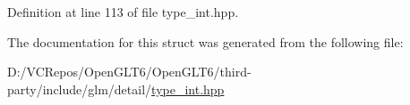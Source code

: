 Definition at line 113 of file type\+\_\+int.\+hpp.



The documentation for this struct was generated from the following file\+:\begin{DoxyCompactItemize}
\item 
D\+:/\+V\+C\+Repos/\+Open\+G\+L\+T6/\+Open\+G\+L\+T6/third-\/party/include/glm/detail/\mbox{\hyperlink{type__int_8hpp}{type\+\_\+int.\+hpp}}\end{DoxyCompactItemize}
